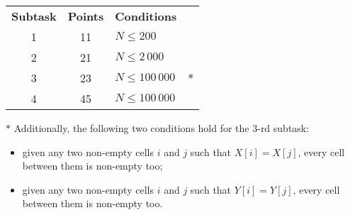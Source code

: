 \begin{tabular}{cclc}
\bf{Subtask}&\bf{Points}&\bf{Conditions}\\
1&11&$N \le 200$\\
2&21&$N \le 2\,000$\\
3&23&$N \le 100\,000$&\LARGE{$*$}\\
4&45&$N \le 100\,000$\\
\end{tabular}

\LARGE{$*$} Additionally, the following two conditions hold for the 3-rd subtask: 
\begin{itemize}
\item given any two non-empty cells $i$ and $j$ such that $X[i] = X[j]$, every cell between them is non-empty too;
\item given any two non-empty cells $i$ and $j$ such that $Y[i] = Y[j]$, every cell between them is non-empty too.
\end{itemize} 
